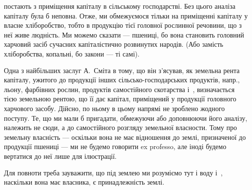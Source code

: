 \parcont{}  %
постають з приміщення капіталу в сільському господарстві. Без цього аналіза
капіталу була б неповна. Отже, ми обмежуємося тільки на приміщенні капіталу
у власне хліборобство, тобто в продукцію тієї головної рослинної речовини, що
з неї живе людність. Ми можемо сказати — пшениці, бо вона становить головний
харчовий засіб сучасних капіталістично розвинутих народів. (Або замість
хліборобства, копальні, бо закони — ті самі).

Одна з найбільших заслуг А.~Сміта в тому, що він з’ясував, як земельна
рента капіталу, ужитого до продукції інших сільсько-господарських продуктів,
напр., льону, фарбівних рослин, продуктів самостійного скотарства і~, визначається
тією земельною рентою, що її дає капітал, приміщений у продукції
головного харчового засобу. Дійсно, по ньому в цьому напрямі не зроблено жодного
поступу. Те, що ми мали б пригадати, обмежуючи або доповнюючи його
аналізу, належить не сюди, а до самостійного розгляду земельної власности.
Тому про земельну власність — оскільки вона не має відношення до землі, призначеної
до продукції пшениці — ми не будемо говорити ex professo, але іноді
будемо вертатися до неї лише для ілюстрації.

Для повноти треба зауважити, що під землею ми розуміємо тут і воду і~,
наскільки вона має власника, є принадлежність землі.

